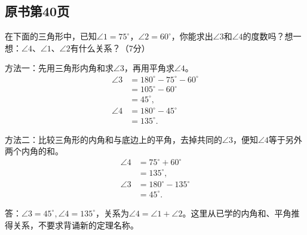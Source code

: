 

\subsection*{原书第40页}

在下面的三角形中，已知\(\angle1=75^\circ\)，\allowbreak{}\(\angle2=60^\circ\)，你能求出\(\angle3\)和\(\angle4\)的度数吗？想一想：\(\angle4\)、\(\angle1\)、\(\angle2\)有什么关系？（7分）\par
{}
\begin{BookAnswer}
方法一：先用三角形内角和求\(\angle3\)，再用平角求\(\angle4\)。\[\begin{aligned}\angle3&=180^\circ-75^\circ-60^\circ\\&=105^\circ-60^\circ\\&=45^\circ,\\\angle4&=180^\circ-45^\circ\\&=135^\circ.\end{aligned}\]\par 方法二：比较三角形的内角和与底边上的平角，去掉共同的\(\angle3\)，便知\(\angle4\)等于另外两个内角的和。\[\begin{aligned}\angle4&=75^\circ+60^\circ\\&=135^\circ,\\\angle3&=180^\circ-135^\circ\\&=45^\circ.\end{aligned}\]\par 答：\(\angle3=45^\circ,\angle4=135^\circ\)，关系为\(\angle4=\angle1+\angle2\)。这里从已学的内角和、平角推得关系，不要求背诵新的定理名称。
\end{BookAnswer}

